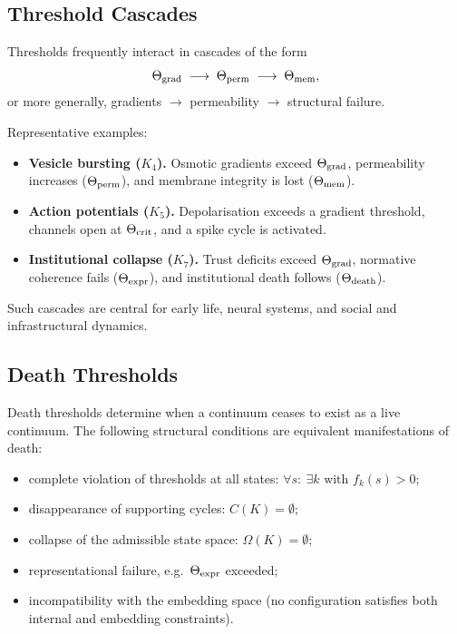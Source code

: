 \subsection{Threshold Cascades}

Thresholds frequently interact in cascades of the form
\[
  \Theta_{\rm grad}
  \;\longrightarrow\;
  \Theta_{\rm perm}
  \;\longrightarrow\;
  \Theta_{\rm mem},
\]
or more generally, gradients \(\to\) permeability \(\to\) structural failure.

Representative examples:

\begin{itemize}
    \item \textbf{Vesicle bursting (\(K_4\)).}  
          Osmotic gradients exceed \(\Theta_{\rm grad}\), permeability increases
          (\(\Theta_{\rm perm}\)), and membrane integrity is lost
          (\(\Theta_{\rm mem}\)).
    \item \textbf{Action potentials (\(K_5\)).}  
          Depolarisation exceeds a gradient threshold, channels open at
          \(\Theta_{\rm crit}\), and a spike cycle is activated.
    \item \textbf{Institutional collapse (\(K_7\)).}  
          Trust deficits exceed \(\Theta_{\rm grad}\), normative coherence
          fails (\(\Theta_{\rm expr}\)), and institutional death follows
          (\(\Theta_{\rm death}\)).
\end{itemize}

Such cascades are central for early life, neural systems, and social and
infrastructural dynamics.

\subsection{Death Thresholds}

Death thresholds determine when a continuum ceases to exist as a live
continuum. The following structural conditions are equivalent manifestations of
death:
\begin{itemize}
    \item complete violation of thresholds at all states:
          \(\forall s:\ \exists k \text{ with } f_k(s) > 0\);
    \item disappearance of supporting cycles: \(C(K)=\emptyset\);
    \item collapse of the admissible state space: \(\Omega(K)=\emptyset\);
    \item representational failure, e.g.\ \(\Theta_{\rm expr}\) exceeded;
    \item incompatibility with the embedding space (no configuration satisfies
          both internal and embedding constraints).
\end{itemize}

